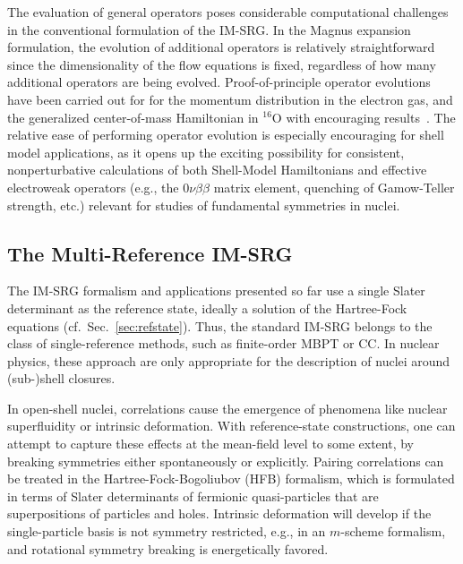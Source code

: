 The evaluation of general operators poses considerable computational
challenges in the conventional formulation of the IM-SRG. In the
Magnus expansion formulation, the evolution of additional operators is
relatively straightforward since the dimensionality of the flow
equations is fixed, regardless of how many additional operators are
being evolved. Proof-of-principle operator evolutions have been
carried out for for the momentum distribution in the electron gas, and
the generalized center-of-mass Hamiltonian in $^{16}$O with encouraging
results~\cite{Morris:2015ve}.  The relative ease of performing
operator evolution is especially encouraging for shell model
applications, as it opens up the exciting possibility for consistent,
nonperturbative calculations of both Shell-Model Hamiltonians and
effective electroweak operators (e.g., the $0\nu\beta\beta$ matrix
element, quenching of Gamow-Teller strength, etc.) relevant for
studies of fundamental symmetries in nuclei.




\subsection{The Multi-Reference IM-SRG}
\label{sec:mrimsrg}

The IM-SRG formalism and applications presented so far use a single
Slater determinant as the reference state, ideally a solution of the
Hartree-Fock equations (cf.~Sec.~\ref{sec:refstate}). Thus, the
standard IM-SRG belongs to the class of single-reference methods, such
as finite-order MBPT or CC. In nuclear physics, these approach are
only appropriate for the description of nuclei around (sub-)shell
closures.

In open-shell nuclei, correlations cause the emergence of phenomena
like nuclear superfluidity or intrinsic deformation. With
reference-state constructions, one can attempt to capture these
effects at the mean-field level to some extent, by breaking symmetries
either spontaneously or explicitly. Pairing correlations can be
treated in the Hartree-Fock-Bogoliubov (HFB) formalism, which is
formulated in terms of Slater determinants of fermionic
quasi-particles that are superpositions of particles and
holes. Intrinsic deformation will develop if the single-particle basis
is not symmetry restricted, e.g., in an $m$-scheme formalism, and
rotational symmetry breaking is energetically favored.

